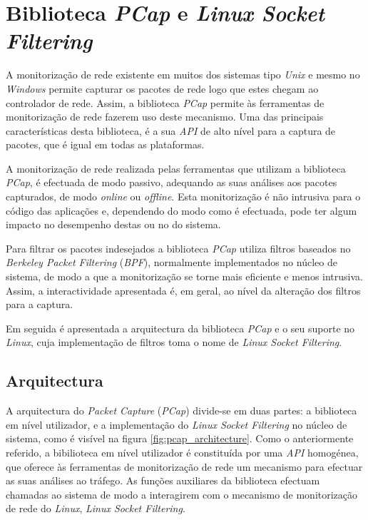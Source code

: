 \section{Biblioteca \textit{PCap} e \textit{Linux Socket Filtering}}\label{sect:LibPcap}

A monitorização de rede existente em muitos dos sistemas tipo \textit{Unix} e mesmo no \textit{Windows} permite capturar os pacotes de rede logo que estes chegam ao controlador de rede.
Assim, a biblioteca \textit{PCap}\cite{LibPcap} permite às ferramentas de monitorização de rede fazerem uso deste mecanismo.
Uma das principais características desta biblioteca, é a sua \textit{API} de alto nível para a captura de pacotes, que é igual em todas as plataformas.

A monitorização de rede realizada pelas ferramentas que utilizam a biblioteca \textit{PCap}, é efectuada de modo passivo, adequando as suas análises aos pacotes capturados, de modo \textit{online} ou \textit{offline}.
Esta monitorização é não intrusiva para o código das aplicações e, dependendo do modo como é efectuada, pode ter algum impacto no desempenho destas ou no do sistema.

Para filtrar os pacotes indesejados a biblioteca \textit{PCap} utiliza filtros baseados no \textit{Berkeley Packet Filtering} (\textit{BPF}), normalmente implementados no núcleo de sistema, de modo a que a monitorização se torne mais eficiente e menos intrusiva.
Assim, a interactividade apresentada é, em geral, ao nível da alteração dos filtros para a captura.

Em seguida é apresentada a arquitectura da biblioteca \textit{PCap} e o seu suporte no \textit{Linux}, cuja implementação de filtros toma o nome de \textit{Linux Socket Filtering}.

\subsection {Arquitectura}
\label{sect:architecture_libpcap}
A arquitectura do \textit{Packet Capture} (\textit{PCap}) divide-se em duas partes: a biblioteca em nível utilizador, e a implementação do \textit{Linux Socket Filtering} no núcleo de sistema, como é visível na figura \ref{fig:pcap_architecture}.
Como o anteriormente referido, a bibilioteca em nível utilizador é constituída por uma \textit{API} homogénea, que oferece às ferramentas de monitorização de rede um mecanismo para efectuar as suas análises ao tráfego.
As funções auxiliares da biblioteca efectuam chamadas ao sistema de modo a interagirem com o mecanismo de monitorização de rede do \textit{Linux}, \textit{Linux Socket Filtering}.

